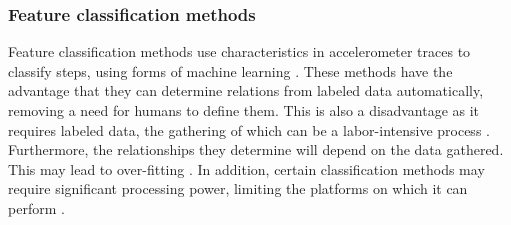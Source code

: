 \subsubsection{Feature classification methods} 
Feature classification methods use characteristics in accelerometer traces to classify steps, using forms of machine learning \cite{Brajdic2013}. These methods have the advantage that they can determine relations from labeled data automatically, removing a need for humans to define them. This is also a disadvantage as it requires labeled data, the gathering of which can be a labor-intensive process \cite{Bulling2014}. Furthermore, the relationships they determine will depend on the data gathered. This may lead to over-fitting \cite{Bulling2014}. In addition, certain classification methods may require significant processing power, limiting the platforms on which it can perform \cite{Yang2014}.

